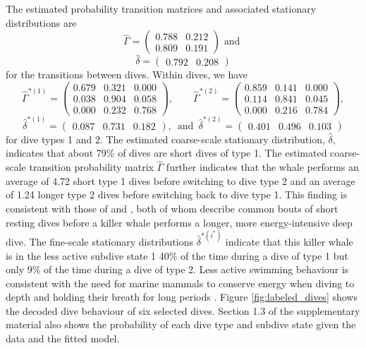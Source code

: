 The estimated probability transition matrices and associated stationary distributions are
%
$$\hat \Gamma = \begin{pmatrix} 
0.788 & 0.212 \\
0.809 & 0.191
\end{pmatrix} \text{ and }$$
$$\hat \delta = \begin{pmatrix} 0.792 & 0.208 \end{pmatrix}$$
%
for the transitions between dives. Within dives, we have
$$\hat \Gamma^{*(1)} = \begin{pmatrix} 
0.679 & 0.321 & 0.000 \\
0.038 & 0.904 & 0.058 \\
0.000 & 0.232 & 0.768
\end{pmatrix}, \qquad 
\hat \Gamma^{*(2)} = \begin{pmatrix} 
0.859 & 0.141 & 0.000 \\
0.114 & 0.841 & 0.045 \\
0.000 & 0.216 & 0.784
\end{pmatrix},$$
$$\hat \delta^{*(1)} = \begin{pmatrix} 0.087 & 0.731 & 0.182 \end{pmatrix}, \enspace \text{and} \enspace \hat \delta^{*(2)} = \begin{pmatrix} 0.401 & 0.496 & 0.103 \end{pmatrix}$$
%
for dive types 1 and 2.
The estimated coarse-scale stationary distribution, $\hat{\delta}$, indicates that about 79\% of dives are short dives of type 1. The estimated coarse-scale transition probability matrix $\hat \Gamma$ further indicates that the whale performs an average of 4.72 short type 1 dives before switching to dive type 2 and an average of 1.24 longer type 2 dives before switching back to dive type 1. This finding is consistent with those of \citet{Tennessen:2019b} and \citet{Williams:2009}, both of whom describe common bouts of short resting dives before a killer whale performs a longer, more energy-intensive deep dive. The fine-scale stationary distributions $\hat{\delta}^{*(i^*)}$ indicate that this killer whale is in the less active subdive state 1 40\% of the time during a dive of type 1 but only 9\% of the time during a dive of type 2. Less active swimming behaviour is consistent with the need for marine mammals to conserve energy when diving to depth and holding their breath for long periods \citep{Williams:1999,Hastie:2006}. Figure \ref{fig:labeled_dives} shows the decoded dive behaviour of six selected dives. Section 1.3 of the supplementary material also shows the probability of each dive type and subdive state given the data and the fitted model.

